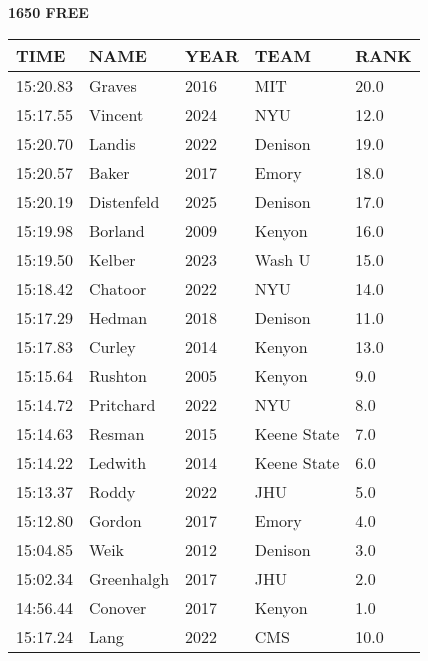 \begin{center}
\begin{minipage}[t]{0.7\textwidth}
\centering
\textbf{1650 FREE}\\[0.05cm]
\begin{tabular}{@{}p{1.8cm}p{2.8cm}p{1.2cm}p{1.4cm}p{0.8cm}@{}}
\hline
\textbf{TIME} & \textbf{NAME} & \textbf{YEAR} & \textbf{TEAM} & \textbf{RANK} \\
\hline
15:20.83 & Graves & 2016 & MIT & 20.0 \\
15:17.55 & Vincent & 2024 & NYU & 12.0 \\
15:20.70 & Landis & 2022 & Denison & 19.0 \\
15:20.57 & Baker & 2017 & Emory & 18.0 \\
15:20.19 & Distenfeld & 2025 & Denison & 17.0 \\
15:19.98 & Borland & 2009 & Kenyon & 16.0 \\
15:19.50 & Kelber & 2023 & Wash U & 15.0 \\
15:18.42 & Chatoor & 2022 & NYU & 14.0 \\
15:17.29 & Hedman & 2018 & Denison & 11.0 \\
15:17.83 & Curley & 2014 & Kenyon & 13.0 \\
15:15.64 & Rushton & 2005 & Kenyon & 9.0 \\
15:14.72 & Pritchard & 2022 & NYU & 8.0 \\
15:14.63 & Resman & 2015 & Keene State & 7.0 \\
15:14.22 & Ledwith & 2014 & Keene State & 6.0 \\
15:13.37 & Roddy & 2022 & JHU & 5.0 \\
15:12.80 & Gordon & 2017 & Emory & 4.0 \\
15:04.85 & Weik & 2012 & Denison & 3.0 \\
15:02.34 & Greenhalgh & 2017 & JHU & 2.0 \\
14:56.44 & Conover & 2017 & Kenyon & 1.0 \\
15:17.24 & Lang & 2022 & CMS & 10.0 \\
\hline
\end{tabular}
\end{minipage}
\end{center}

\vspace{0.4cm}

